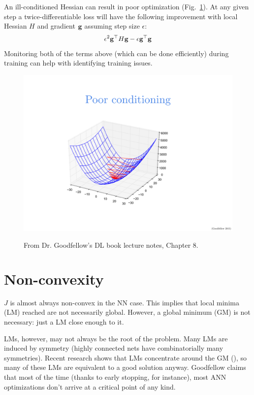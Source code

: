 \documentclass{article}
\begin{document}
An ill-conditioned Hessian can result in poor optimization (Fig.~\ref{fig:illcond}). At any given step a twice-differentiable loss will have the following improvement with local Hessian $H$ and gradient $\textbf{g}$ assuming step size $\epsilon$:
$$
\epsilon^2 \textbf{g}^\top H\textbf{g}-\epsilon \textbf{g}^\top\textbf{g}
$$
Monitoring both of the terms above (which can be done efficiently) during training can help with identifying training issues.

\begin{figure}[!h]
\centering
{\includegraphics[width=\textwidth]{ill-condition.pdf}}
\caption{From Dr. Goodfellow's DL book lecture notes, Chapter 8.}
\label{fig:illcond}
\end{figure}

\section{Non-convexity}

$J$ is almost always non-convex in the NN case. This implies that local minima (LM) reached are not necessarily global. However, a global minimum (GM) is not necessary: just a LM close enough to it.

LMs, however, may not always be the root of the problem. Many LMs are induced by symmetry (highly connected nets have combinatorially many symmetries). Recent research shows that LMs concentrate around the GM (), so many of these LMs are equivalent to a good solution anyway. Goodfellow claims that most of the time (thanks to early stopping, for instance), most ANN optimizations don't arrive at a critical point of any kind.
\end{document}
